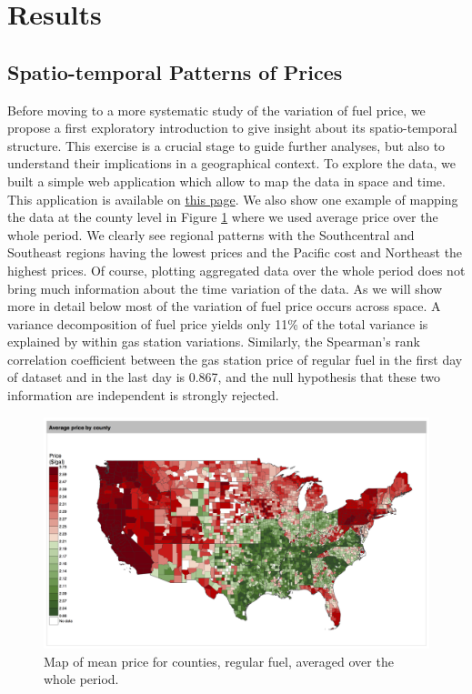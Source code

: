 \documentclass[3p,times,procedia]{elsarticle}
\begin{document}


\section{Results} \label{sec:result}

\subsection{Spatio-temporal Patterns of Prices}\label{subsec:patterns}

Before moving to a more systematic study of the variation of fuel price, we propose a first exploratory introduction to give insight about its spatio-temporal structure. This exercise is a crucial stage to guide further analyses, but also to understand their implications in a geographical context. To explore the data, we built a simple web application which allow to map the data in space and time. This application is available on \href{http://shiny.parisgeo.cnrs.fr/fuelprice}{this page}. We also show one example of mapping the data at the county level in Figure \ref{fig:map_price} where we used average price over the whole period. We clearly see regional patterns with the Southcentral and Southeast regions having the lowest prices and the Pacific cost and Northeast the highest prices. Of course, plotting aggregated data over the whole period does not bring much information about the time variation of the data. As we will show more in detail below most of the variation of fuel price occurs across space. A variance decomposition of fuel price yields only 11\% of the total variance is explained by within gas station variations. Similarly, the Spearman's rank correlation coefficient between the gas station price of regular fuel in the first day of dataset and in the last day is 0.867, and the null hypothesis that these two information are independent is strongly rejected.

\begin{figure}
\centering
\includegraphics[width=\textwidth]{figures/average_regular_map}
\caption{Map of mean price for counties, regular fuel, averaged over the whole period.}\vspace{-0.3cm}
\label{fig:map_price}
\end{figure}
\end{document}
